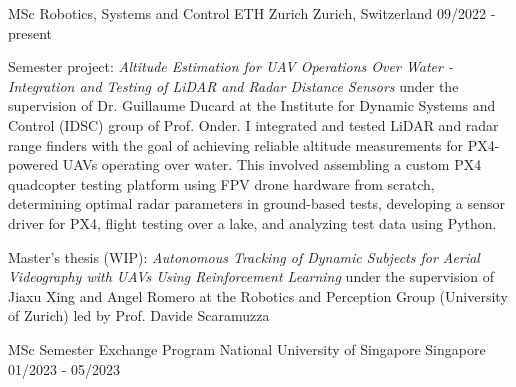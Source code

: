 

\begin{cventries}

  \cventry
    {MSc Robotics, Systems and Control} %
    {ETH Zurich} %
    {Zurich, Switzerland} %
    {09/2022 - present} %
    {
      \begin{cvitems} %
        \item Semester project: \textit{Altitude Estimation for UAV Operations Over Water - Integration and Testing of LiDAR and
        Radar Distance Sensors} under the supervision of Dr. Guillaume Ducard at the Institute for Dynamic Systems and Control (IDSC) group of Prof. Onder. I integrated and tested LiDAR and radar range finders with the goal of achieving reliable altitude measurements for PX4-powered UAVs operating over water. This involved assembling a custom PX4 quadcopter testing platform using FPV drone hardware from scratch, determining optimal radar parameters in ground-based tests, developing a sensor driver for PX4, flight testing over a lake, and analyzing test data using Python.
        \item Master's thesis (WIP): \textit{Autonomous Tracking of Dynamic Subjects for Aerial Videography with UAVs Using Reinforcement Learning} under the supervision of Jiaxu Xing and Angel Romero at the Robotics and Perception Group (University of Zurich) led by Prof. Davide Scaramuzza
      \end{cvitems}
    }

  \cventry
  {MSc Semester Exchange Program} %
  {National University of Singapore} %
  {Singapore} %
  {01/2023 - 05/2023} %
  {
  }


\end{cventries}

